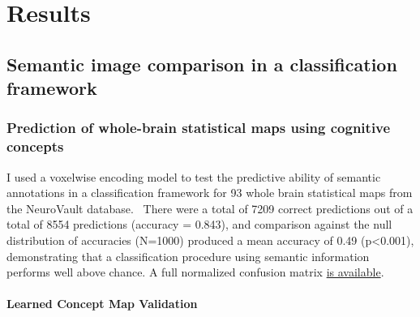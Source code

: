 \documentclass{report}
\begin{document}
\section{Results}

\subsection{Semantic image comparison in a classification framework}

\subsubsection{Prediction of whole-brain statistical maps using cognitive concepts}
I used a voxelwise encoding model to test the predictive ability of
semantic annotations in a classification framework for 93 whole brain statistical maps from the NeuroVault database. ~There were a
total of 7209 correct predictions out of a total of 8554 predictions
(accuracy = 0.843), and comparison against the null distribution of
accuracies (N=1000) produced a mean accuracy of 0.49
(p\textless{}0.001), demonstrating that a classification procedure using
semantic information performs well above chance. A full normalized
confusion matrix \href{https://github.com/vsoch/semantic-image-comparison/blob/master/update/encoding_regression_performance/classification_confusion_binary_4mm_perform_norm.tsv}{is available}.

\paragraph{Learned Concept Map Validation}
\end{document}
